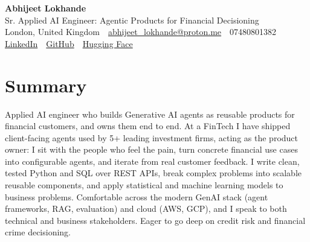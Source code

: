 \documentclass[10pt,a4paper]{article}
\newcommand{\sep}{\,\textcolor{accent!60}{\textbar}\,}
\begin{document}
\begin{center}
  {\fontsize{24}{26}\selectfont\bfseries Abhijeet Lokhande}\\[3pt]
  {\color{accent}\large Sr. Applied AI Engineer: Agentic Products for Financial Decisioning}\\[5pt]
  {\small
    London, United Kingdom \sep
    \href{mailto:abhijeet_lokhande@proton.me}{abhijeet\_lokhande@proton.me} \sep
    07480801382 \\[2pt]
    \href{https://www.linkedin.com/in/ablds/}{LinkedIn} \sep
    \href{https://github.com/abhijeetscode}{GitHub} \sep
    \href{https://huggingface.co/ab-ai}{Hugging Face}
  }
\end{center}
\vspace{2pt}

\section{Summary}
Applied AI engineer who builds Generative AI agents as reusable products for financial customers, and owns them end to end. At a FinTech I have shipped client-facing agents used by 5+ leading investment firms, acting as the product owner: I sit with the people who feel the pain, turn concrete financial use cases into configurable agents, and iterate from real customer feedback. I write clean, tested Python and SQL over REST APIs, break complex problems into scalable reusable components, and apply statistical and machine learning models to business problems. Comfortable across the modern GenAI stack (agent frameworks, RAG, evaluation) and cloud (AWS, GCP), and I speak to both technical and business stakeholders. Eager to go deep on credit risk and financial crime decisioning.

\end{document}
